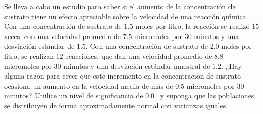 \begin{enunciado}
 Se lleva a cabo un estudio para saber si el aumento de la concentraci\'on de sustrato tiene un efecto apreciable sobre la velocidad de una reacci\'on qu\'{\i}mica. Con una concentraci\'on de sustrato de 1.5 moles por litro, la reacci\'on se realiz\'o $15$ veces, con una velocidad promedio de $7.5$ micromoles por 30 minutos y una desviaci\'on est\'andar de $1.5$. Con una concentraci\'on de sustrato de 2.0 moles por litro, se realizan $12$ reacciones, que dan una velocidad promedio de $8.8$ micromoles por 30 minutos y una desviaci\'on est\'andar muestral de $1.2$. ¿Hay alguna raz\'on para creer que este incremento en la concentraci\'on de sustrato ocasiona un aumento en la velocidad media de m\'as de $0.5$ micromoles por 30 minutos? Utiilice un nivel de significancia de $0.01$ y suponga que las poblaciones se distribuyen de forma aproximadamente normal con varianzas iguales.
\end{enunciado}

